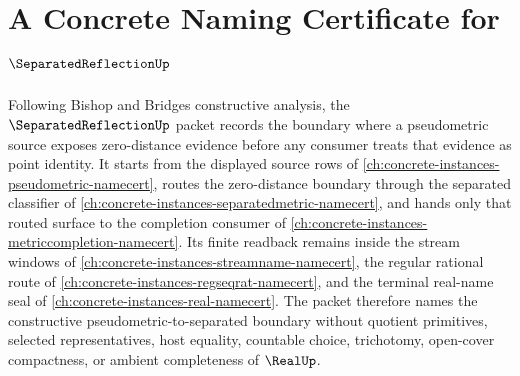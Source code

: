 \chapter{A Concrete Naming Certificate for $\SeparatedReflectionUp$}
\label{ch:concrete-instances-separated-reflection-namecert}

Following Bishop and Bridges constructive analysis, the $\SeparatedReflectionUp$ packet records the boundary where a pseudometric source exposes zero-distance evidence before any consumer treats that evidence as point identity. It starts from the displayed source rows of \autoref{ch:concrete-instances-pseudometric-namecert}, routes the zero-distance boundary through the separated classifier of \autoref{ch:concrete-instances-separatedmetric-namecert}, and hands only that routed surface to the completion consumer of \autoref{ch:concrete-instances-metriccompletion-namecert}. Its finite readback remains inside the stream windows of \autoref{ch:concrete-instances-streamname-namecert}, the regular rational route of \autoref{ch:concrete-instances-regseqrat-namecert}, and the terminal real-name seal of \autoref{ch:concrete-instances-real-namecert}. The packet therefore names the constructive pseudometric-to-separated boundary without quotient primitives, selected representatives, host equality, countable choice, trichotomy, open-cover compactness, or ambient completeness of $\RealUp$.

